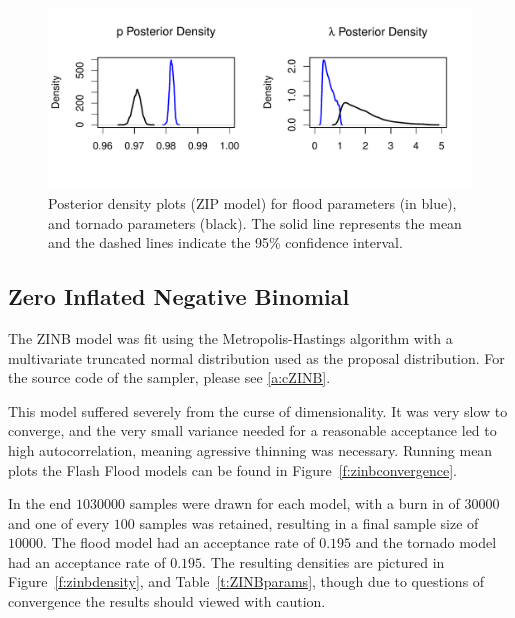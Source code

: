\documentclass{article}\usepackage[]{graphicx}\usepackage[]{color}
\begin{document}
\begin{figure}[p]
\centering
\includegraphics[width=.65\textwidth]{figure/ZIP_Density.pdf}
\caption{Posterior density plots (ZIP model) for flood parameters (in blue), and tornado parameters (black). The solid line represents the mean and the dashed lines indicate the 95\% confidence interval.}
\label{f:zipdensity}
\end{figure}

\subsection{Zero Inflated Negative Binomial}
\label{ss:rZiNBinom}



The ZINB model was fit using the Metropolis-Hastings algorithm with a multivariate truncated normal distribution used as the proposal distribution. For the source code of the sampler, please see \ref{a:cZINB}.

This model suffered severely from the curse of dimensionality. It was very slow to converge, and the very small variance needed for a reasonable acceptance led to high autocorrelation, meaning agressive thinning was necessary. Running mean plots the Flash Flood models can be found in Figure~\ref{f:zinbconvergence}. 


In the end $1030000$ samples were drawn for each model, with a burn in of $30000$ and one of every $100$ samples was retained, resulting in a final sample size of $10000$. The flood model had an acceptance rate of $0.195$ and the tornado model had an acceptance rate of $0.195$. The resulting densities are pictured in Figure~\ref{f:zinbdensity}, and Table~\ref{t:ZINBparams}, though due to questions of convergence the results should viewed with caution.
\end{document}
